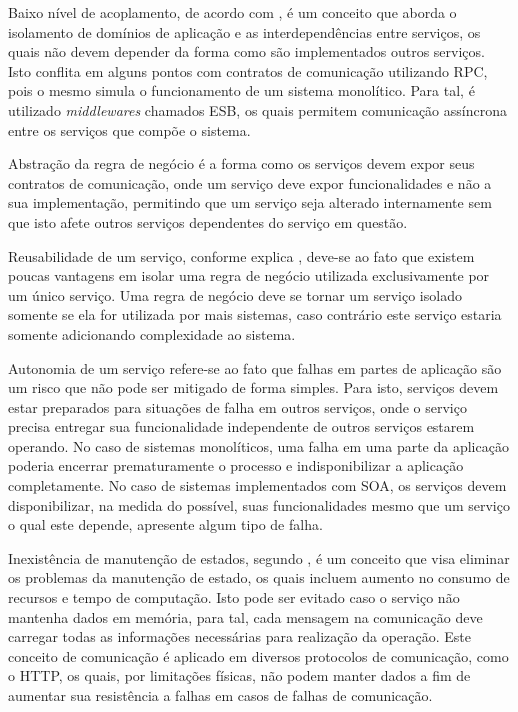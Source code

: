 Baixo nível de acoplamento, de acordo com , é um
conceito que aborda o isolamento de domínios de aplicação e as
interdependências entre serviços, os quais não devem depender da forma
como são implementados outros serviços. Isto conflita em alguns pontos
com contratos de comunicação utilizando \ac{RPC}, pois o mesmo simula
o funcionamento de um sistema monolítico. Para tal, é utilizado
\emph{middlewares} chamados \ac{ESB}, os quais permitem comunicação
assíncrona entre os serviços que compõe o sistema.

Abstração da regra de negócio é a forma como os serviços devem expor
seus contratos de comunicação, onde um serviço deve expor funcionalidades
e não a sua implementação, permitindo que um serviço seja alterado internamente
sem que isto afete outros serviços dependentes do serviço em questão.

Reusabilidade de um serviço, conforme explica , deve-se
ao fato que existem poucas vantagens em isolar uma regra de negócio utilizada
exclusivamente por um único serviço. Uma regra de negócio deve se tornar um
serviço isolado somente se ela for utilizada por mais sistemas, caso
contrário este serviço estaria somente adicionando complexidade ao sistema.

Autonomia de um serviço refere-se ao fato que falhas em partes de aplicação
são um risco que não pode ser mitigado de forma simples. Para isto, serviços
devem estar preparados para situações de falha em outros serviços, onde
o serviço precisa entregar sua funcionalidade independente de outros serviços
estarem operando. No caso de sistemas monolíticos, uma falha em uma parte
da aplicação poderia encerrar prematuramente o processo e indisponibilizar
a aplicação completamente. No caso de sistemas implementados com \ac{SOA},
os serviços devem disponibilizar, na medida do possível, suas funcionalidades
mesmo que um serviço o qual este depende, apresente algum tipo de falha.

Inexistência de manutenção de estados, segundo , é
um conceito que visa eliminar os problemas da manutenção de estado, os quais
incluem aumento no consumo de recursos e tempo de computação. Isto pode ser
evitado caso o serviço não mantenha dados em memória, para tal, cada mensagem
na comunicação deve carregar todas as informações necessárias para realização
da operação. Este conceito de comunicação é aplicado em diversos protocolos
de comunicação, como o \ac{HTTP}, os quais, por limitações físicas, não podem
manter dados a fim de aumentar sua resistência a falhas em casos de falhas
de comunicação.

